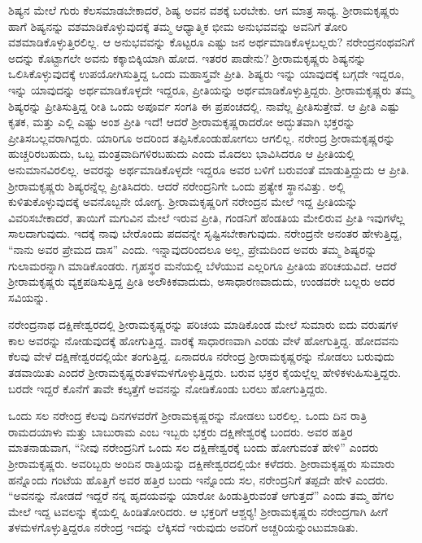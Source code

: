 ಶಿಷ್ಯನ ಮೇಲೆ ಗುರು ಕೆಲಸಮಾಡಬೇಕಾದರೆ, ಶಿಷ್ಯ ಅವನ ವಶಕ್ಕೆ ಬರಬೇಕು. ಆಗ ಮಾತ್ರ ಸಾಧ್ಯ. ಶ‍್ರೀರಾಮಕೃಷ್ಣರು ಹಾಗೆ ಶಿಷ್ಯನನ್ನು ವಶಮಾಡಿಕೊಳ್ಳುವು\-ದಕ್ಕೆ ತಮ್ಮ ಆಧ್ಯಾತ್ಮಿಕ ಭೀಮ ಅನುಭವವನ್ನು ಅವನಿಗೆ ತೋರಿ ವಶಮಾಡಿಕೊಳ್ಳುತ್ತಿರಲಿಲ್ಲ. ಆ ಅನುಭವವನ್ನು ಕೊಟ್ಟರೂ ಎಷ್ಟು ಜನ ಅರ್ಥಮಾಡಿಕೊಳ್ಳಬಲ್ಲರು? ನರೇಂದ್ರನಂಥವನಿಗೆ ಅದನ್ನು ಕೊಟ್ಟಾಗಲೇ ಅವನು ಕಕ್ಕಾಬಿಕ್ಕಿಯಾಗಿ ಹೋದ. ಇತರರ ಪಾಡೇನು? ಶ‍್ರೀರಾಮಕೃಷ್ಣರು ಶಿಷ್ಯನನ್ನು ಒಲಿಸಿಕೊಳ್ಳುವುದಕ್ಕೆ ಉಪಯೋಗಿಸುತ್ತಿದ್ದ ಒಂದು ಮಹಾಸ್ತ್ರವೇ ಪ್ರೀತಿ. ಶಿಷ್ಯರು ಇನ್ನು ಯಾವುದಕ್ಕೆ ಬಗ್ಗದೇ ಇದ್ದರೂ, ಇನ್ನು ಯಾವುದನ್ನು ಅರ್ಥಮಾಡಿಕೊಳ್ಳದೇ ಇದ್ದರೂ, ಪ್ರೀತಿಯನ್ನು ಅರ್ಥಮಾಡಿಕೊಳ್ಳುತ್ತಿದ್ದರು. ಶ‍್ರೀರಾಮಕೃಷ್ಣರು ತಮ್ಮ ಶಿಷ್ಯರನ್ನು ಪ್ರೀತಿಸುತ್ತಿದ್ದ ರೀತಿ ಒಂದು ಅಪೂರ್ವ ಸಂಗತಿ ಈ ಪ್ರಪಂಚದಲ್ಲಿ. ನಾವೆಲ್ಲ ಪ್ರೀತಿಸುತ್ತೇವೆ. ಆ ಪ್ರೀತಿ ಎಷ್ಟು ಕೃತಕ, ಮತ್ತು ಎಲ್ಲಿ ಎಷ್ಟು ಅಂಶ ಪ್ರೀತಿ ಇದೆ! ಆದರೆ ಶ‍್ರೀರಾಮಕೃಷ್ಣರಾದರೋ ಅದ್ಭುತವಾಗಿ ಭಕ್ತರನ್ನು ಪ್ರೀತಿಸಬಲ್ಲವರಾಗಿದ್ದರು. ಯಾರಿಗೂ ಅದರಿಂದ ತಪ್ಪಿಸಿಕೊಂಡುಹೋಗಲು ಆಗಲಿಲ್ಲ. ನರೇಂದ್ರ ಶ‍್ರೀರಾಮಕೃಷ್ಣರನ್ನು ಹುಚ್ಚರಿರಬಹುದು, ಒಬ್ಬ ಮಂತ್ರವಾದಿಗಳಿರಬಹುದು ಎಂದು ಮೊದಲು ಭಾವಿಸಿದರೂ ಆ ಪ್ರೀತಿಯಲ್ಲಿ ಅನುಮಾನವಿರಲಿಲ್ಲ. ಅವರನ್ನು ಅರ್ಥಮಾಡಿಕೊಳ್ಳದೇ ಇದ್ದರೂ ಅವರ ಬಳಿಗೆ ಬರುವಂತೆ ಮಾಡುತ್ತಿದ್ದುದು ಆ ಪ್ರೀತಿ. ಶ‍್ರೀರಾಮಕೃಷ್ಣರು ಶಿಷ್ಯರನ್ನೆಲ್ಲ ಪ್ರೀತಿಸಿದರು. ಆದರೆ ನರೇಂದ್ರನಿಗೇ ಒಂದು ಪ್ರತ್ಯೇಕ ಸ್ಥಾನವಿತ್ತು. ಅಲ್ಲಿ ಕುಳಿತುಕೊಳ್ಳುವುದಕ್ಕೆ ಅವನೊಬ್ಬನೇ ಯೋಗ್ಯ. ಶ‍್ರೀರಾಮಕೃಷ್ಣರಿಗೆ ನರೇಂದ್ರನ ಮೇಲೆ ಇದ್ದ ಪ್ರೀತಿಯನ್ನು ವಿವರಿಸಬೇಕಾದರೆ, ತಾಯಿಗೆ ಮಗುವಿನ ಮೇಲೆ ಇರುವ ಪ್ರೀತಿ, ಗಂಡನಿಗೆ ಹೆಂಡತಿಯ ಮೇಲಿರುವ ಪ್ರೀತಿ ಇವುಗಳೆಲ್ಲ ಸಾಲದಾಗುವುದು. ಇದಕ್ಕೆ ನಾವು ಬೇರೊಂದು ಪದವನ್ನೇ ಸೃಷ್ಟಿಸಬೇಕಾಗುವುದು. ನರೇಂದ್ರನೇ ಅನಂತರ ಹೇಳುತ್ತಿದ್ದ, “ನಾನು ಅವರ ಪ್ರೇಮದ ದಾಸ” ಎಂದು. ಇನ್ನಾವುದರಿಂದಲೂ ಅಲ್ಲ, ಪ್ರೇಮದಿಂದ ಅವರು ತಮ್ಮ ಶಿಷ್ಯರನ್ನು ಗುಲಾಮರನ್ನಾಗಿ ಮಾಡಿಕೊಂಡರು. ಗೃಹಸ್ಥರ ಮನೆಯಲ್ಲಿ ಬೆಳೆಯುವ ಎಲ್ಲರಿಗೂ ಪ್ರೀತಿಯ ಪರಿಚಯವಿದೆ. ಆದರೆ ಶ‍್ರೀರಾಮಕೃಷ್ಣರು ವ್ಯಕ್ತಪಡಿಸುತ್ತಿದ್ದ ಪ್ರೀತಿ ಅಲೌಕಿಕವಾದುದು, ಅಸಾಧಾರಣವಾದುದು, ಉಂಡವರೇ ಬಲ್ಲರು ಅದರ ಸವಿಯನ್ನು.

ನರೇಂದ್ರನಾಥ ದಕ್ಷಿಣೇಶ್ವರದಲ್ಲಿ ಶ‍್ರೀರಾಮಕೃಷ್ಣರನ್ನು ಪರಿಚಯ ಮಾಡಿಕೊಂಡ ಮೇಲೆ ಸುಮಾರು ಐದು ವರುಷಗಳ ಕಾಲ ಅವರನ್ನು ನೋಡುವುದಕ್ಕೆ ಹೋಗುತ್ತಿದ್ದ. ವಾರಕ್ಕೆ ಸಾಧಾರಣವಾಗಿ ಎರಡು ವೇಳೆ ಹೋಗುತ್ತಿದ್ದ. ಹೋದವನು ಕೆಲವು ವೇಳೆ ದಕ್ಷಿಣೇಶ್ವರದಲ್ಲಿಯೇ ತಂಗುತ್ತಿದ್ದ. ಏನಾದರೂ ನರೇಂದ್ರ ಶ‍್ರೀರಾಮಕೃಷ್ಣರನ್ನು ನೋಡಲು ಬರುವುದು ತಡವಾಯಿತು ಎಂದರೆ ಶ‍್ರೀರಾಮಕೃಷ್ಣರು\break ತಳಮಳಗೊಳ್ಳುತ್ತಿದ್ದರು. ಬರುವ ಭಕ್ತರ ಕೈಯಲ್ಲೆಲ್ಲ ಹೇಳಿಕಳುಹಿಸುತ್ತಿದ್ದರು. ಬರದೇ ಇದ್ದರೆ ಕೊನೆಗೆ ತಾವೇ ಕಲ್ಕತ್ತೆಗೆ ಅವನನ್ನು ನೋಡಿಕೊಂಡು ಬರಲು ಹೋಗುತ್ತಿದ್ದರು.

ಒಂದು ಸಲ ನರೇಂದ್ರ ಕೆಲವು ದಿನಗಳವರೆಗೆ ಶ‍್ರೀರಾಮಕೃಷ್ಣರನ್ನು ನೋಡಲು ಬರಲಿಲ್ಲ. ಒಂದು ದಿನ ರಾತ್ರಿ ರಾಮದಯಾಳು ಮತ್ತು ಬಾಬುರಾಮ ಎಂಬ ಇಬ್ಬರು ಭಕ್ತರು ದಕ್ಷಿಣೇಶ್ವರಕ್ಕೆ ಬಂದರು. ಅವರ ಹತ್ತಿರ ಮಾತನಾಡುವಾಗ, “ನೀವು ನರೇಂದ್ರನಿಗೆ ಒಂದು ಸಲ ದಕ್ಷಿಣೇಶ್ವರಕ್ಕೆ ಬಂದು ಹೋಗುವಂತೆ ಹೇಳಿ” ಎಂದರು ಶ‍್ರೀರಾಮಕೃಷ್ಣರು. ಅವರಿಬ್ಬರು ಅಂದಿನ ರಾತ್ರಿಯನ್ನು ದಕ್ಷಿಣೇಶ್ವರದಲ್ಲಿಯೇ ಕಳೆದರು. ಶ‍್ರೀರಾಮಕೃಷ್ಣರು ಸುಮಾರು ಹನ್ನೊಂದು ಗಂಟೆಯ ಹೊತ್ತಿಗೆ ಅವರ ಹತ್ತಿರ ಬಂದು ಇನ್ನೊಂದು ಸಲ, ನರೇಂದ್ರನಿಗೆ ತಪ್ಪದೇ ಹೇಳಿ ಎಂದರು. “ಅವನನ್ನು ನೋಡದೆ ಇದ್ದರೆ ನನ್ನ ಹೃದಯವನ್ನು ಯಾರೋ ಹಿಂಡುತ್ತಿರುವಂತೆ ಆಗುತ್ತದೆ” ಎಂದು ತಮ್ಮ ಹೆಗಲ ಮೇಲೆ ಇದ್ದ ಟವಲನ್ನು ಕೈಯಲ್ಲಿ ಹಿಂಡಿತೋರಿದರು. ಆ ಭಕ್ತರಿಗೆ ಆಶ್ಚರ‍್ಯ! ಶ‍್ರೀರಾಮಕೃಷ್ಣರು ನರೇಂದ್ರಗಾಗಿ ಹೀಗೆ ತಳಮಳಗೊಳ್ಳುತ್ತಿದ್ದರೂ ನರೇಂದ್ರ ಇದನ್ನು ಲೆಕ್ಕಿಸದೆ ಇರುವುದು ಅವರಿಗೆ ಅಚ್ಚರಿಯನ್ನುಂಟುಮಾಡಿತು.

